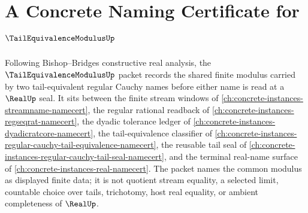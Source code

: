 \chapter{A Concrete Naming Certificate for $\TailEquivalenceModulusUp$}
\label{ch:concrete-instances-tail-equivalence-modulus-namecert}

Following Bishop--Bridges constructive real analysis, the $\TailEquivalenceModulusUp$ packet records the shared finite modulus carried by two tail-equivalent regular Cauchy names before either name is read at a $\RealUp$ seal. It sits between the finite stream windows of \autoref{ch:concrete-instances-streamname-namecert}, the regular rational readback of \autoref{ch:concrete-instances-regseqrat-namecert}, the dyadic tolerance ledger of \autoref{ch:concrete-instances-dyadicratcore-namecert}, the tail-equivalence classifier of \autoref{ch:concrete-instances-regular-cauchy-tail-equivalence-namecert}, the reusable tail seal of \autoref{ch:concrete-instances-regular-cauchy-tail-seal-namecert}, and the terminal real-name surface of \autoref{ch:concrete-instances-real-namecert}. The packet names the common modulus as displayed finite data; it is not quotient stream equality, a selected limit, countable choice over tails, trichotomy, host real equality, or ambient completeness of $\RealUp$.


